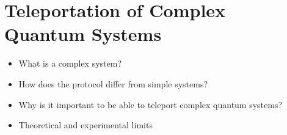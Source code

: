\section{Teleportation of Complex Quantum Systems}
\begin{itemize}
    \item What is a complex system?
    \item How does the protocol differ from simple systems?
    \item Why is it important to be able to teleport complex quantum systems?
    \item Theoretical and experimental limits
\end{itemize}